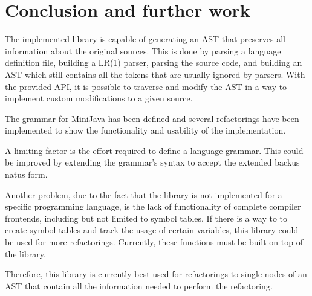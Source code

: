 \section{Conclusion and further work}

The implemented library is capable of generating an AST that preserves all information about the original sources.
This is done by parsing a language definition file, building a LR(1) parser, parsing the source code, and building an AST
which still contains all the tokens that are usually ignored by parsers.
With the provided API, it is possible to traverse and modify the AST in a way to implement custom modifications to a given source.

The grammar for MiniJava has been defined and several refactorings have been implemented to show the functionality and usability of the implementation.

A limiting factor is the effort required to define a language grammar. This could be improved by extending the grammar's
syntax to accept the extended backus natus form.

Another problem, due to the fact that the library is not implemented for a specific programming language, is the lack of 
functionality of complete compiler frontends, including but not limited to symbol tables. If there is a way to 
to create symbol tables and track the usage of certain variables, this library could be used for more refactorings.
Currently, these functions must be built on top of the library.

Therefore, this library is currently best used for refactorings to single nodes of an AST that contain all the information needed to perform the refactoring.